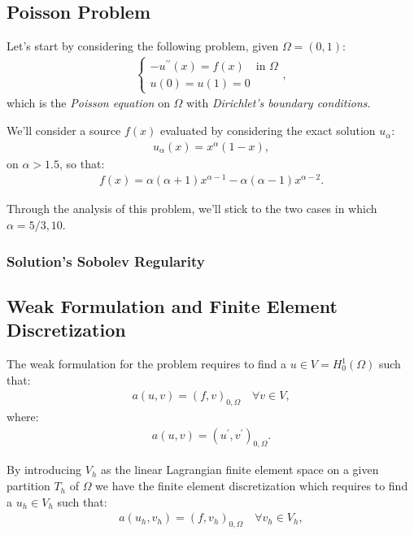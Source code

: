 \subsection{Poisson Problem}

Let's start by considering the following problem, given $\Omega = (0, 1)$:
\begin{gather}
	\begin{cases}
		-u^{\prime \prime}(x) = f(x) \quad \text{in } \Omega \\
		u(0) = u(1) = 0
	\end{cases},
\end{gather}
which is the \textit{Poisson equation} on $\Omega$ with \textit{Dirichlet's boundary conditions}.

We'll consider a source $f(x)$ evaluated by considering the exact solution $u_{\alpha}$:
\begin{gather}
	u_{\alpha}(x) = x^{\alpha} (1 - x),
\end{gather}
on $\alpha > 1.5$, so that:
\begin{gather}
	f(x) = \alpha (\alpha + 1) x^{\alpha - 1} - \alpha (\alpha - 1) x^{\alpha - 2}.
\end{gather}

Through the analysis of this problem, we'll stick to the two cases in which $\alpha = 5/3, 10$.

\subsubsection{Solution's Sobolev Regularity}


\subsection{Weak Formulation and Finite Element Discretization} \label{fem_definition}

The weak formulation for the problem requires to find a $u \in V = H_0^1(\Omega)$ such that:
\begin{gather}
	a(u, v) = (f, v)_{0, \Omega} \quad \forall v \in V,
\end{gather}
where:
\begin{gather}
	a(u, v) = (u^{\prime}, v^{\prime})_{0, \Omega}.
\end{gather}

By introducing $V_h$ as the linear Lagrangian finite element space on a given partition $T_h$ of $\Omega$ we have the finite element discretization which requires to find a $u_h \in V_h$ such that:
\begin{gather}
	a(u_h, v_h) = (f, v_h)_{0, \Omega} \quad \forall v_h \in V_h,
\end{gather}